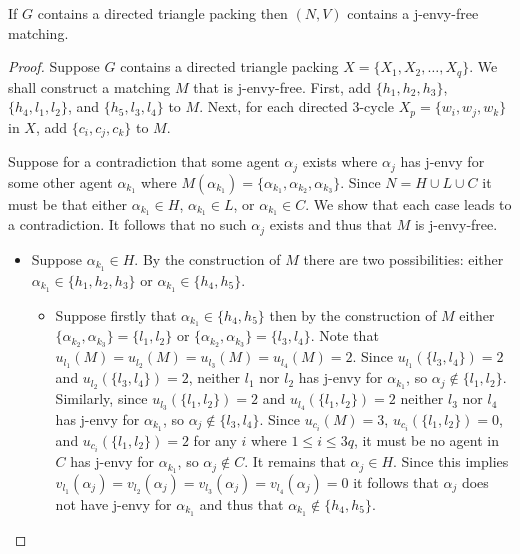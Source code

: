 \begin{lem}
\label{lem:threed_efr_as_jef_terasym_first_direction}
If $G$ contains a directed triangle packing then $(N, V)$ contains a j-envy-free matching.
\end{lem}
\begin{proof}
Suppose $G$ contains a directed triangle packing $X = \{ X_1, X_2, \dots, X_q \}$. We shall construct a matching $M$ that is j-envy-free. First, add $\{ h_1, h_2, h_3 \}$, $\{ h_4, l_1, l_2 \}$, and $\{ h_5, l_3, l_4 \}$ to $M$. Next, for each directed $3$-cycle $X_p = \{ w_i, w_j, w_k \}$ in $X$, add $\{ c_i, c_j, c_k \}$ to $M$.

Suppose for a contradiction that some agent $\alpha_j$ exists where $\alpha_j$ has j-envy for some other agent $\alpha_{k_1}$ where $M(\alpha_{k_1}) = \{ \alpha_{k_1}, \alpha_{k_2}, \alpha_{k_3} \}$. Since $N = H \cup L \cup C$ it must be that either $\alpha_{k_1} \in H$, $\alpha_{k_1} \in L$, or $\alpha_{k_1} \in C$. We show that each case leads to a contradiction. It follows that no such $\alpha_j$ exists and thus that $M$ is j-envy-free.
\begin{itemize}
    \item Suppose $\alpha_{k_1} \in H$. By the construction of $M$ there are two possibilities: either $\alpha_{k_1} \in \{ h_1, h_2, h_3 \}$ or $\alpha_{k_1} \in \{ h_4, h_5 \}$. 
    \begin{itemize}
    \item Suppose firstly that $\alpha_{k_1} \in \{ h_4, h_5 \}$ then by the construction of $M$ either $\{ \alpha_{k_2}, \alpha_{k_3} \} = \{ l_1, l_2 \}$ or $\{ \alpha_{k_2}, \alpha_{k_3} \} = \{ l_3, l_4 \}$. Note that $u_{l_1}(M) = u_{l_2}(M) = u_{l_3}(M) = u_{l_4}(M) = 2$. Since $u_{l_1}(\{ l_3, l_4 \}) = 2$ and $u_{l_2}(\{ l_3, l_4 \}) = 2$, neither $l_1$ nor $l_2$ has j-envy for $\alpha_{k_1}$, so $\alpha_j \notin \{ l_1, l_2 \}$. Similarly, since $u_{l_3}(\{ l_1, l_2 \}) = 2$ and $u_{l_4}(\{ l_1, l_2 \}) = 2$ neither $l_3$ nor $l_4$ has j-envy for $\alpha_{k_1}$, so $\alpha_j \notin \{ l_3, l_4 \}$. Since $u_{c_i}(M) = 3$, $u_{c_i}(\{ l_1, l_2 \}) = 0$, and $u_{c_i}(\{ l_1, l_2 \}) = 2$ for any $i$ where $1\leq i \leq 3q$, it must be no agent in $C$ has j-envy for $\alpha_{k_1}$, so $\alpha_j \notin C$. It remains that $\alpha_{j} \in H$. Since this implies $v_{l_1}(\alpha_j) = v_{l_2}(\alpha_j) = v_{l_3}(\alpha_j) = v_{l_4}(\alpha_j) = 0$ it follows that $\alpha_j$ does not have j-envy for $\alpha_{k_1}$ and thus that $\alpha_{k_1} \notin \{ h_4, h_5 \}$.
    

\end{itemize}
\end{itemize}
\end{proof}
